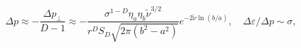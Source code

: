 \begin{equation}\label{deltaqsigll1}
\Delta p\approx -\frac{\Delta p_{\perp }}{D-1}\approx
-\frac{\sigma ^{1-D}\eta _a\eta _b\tilde \nu
^{3/2}}{r^DS_D\sqrt{2\pi (b^2-a^2)}}e^{-2\tilde \nu \ln (b/a)},
\quad \Delta \varepsilon /\Delta p\sim \sigma ,
\end{equation}

